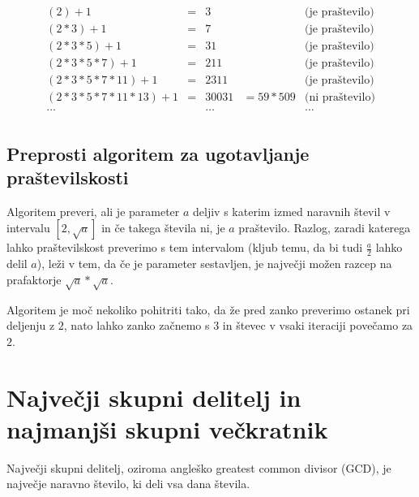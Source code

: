 \documentclass[10pt,a4paper,oneside]{book}
\begin{document}
\[\begin{array}{ccccc}
(2)+1 &=& 3& &\mbox{(je praštevilo)}\\
(2*3)+1 &=& 7& &\mbox{(je praštevilo)}\\
(2*3*5)+1 &=& 31& &\mbox{(je praštevilo)}\\
(2*3*5*7)+1 &=& 211& &\mbox{(je praštevilo)}\\
(2*3*5*7*11)+1 &=& 2311& &\mbox{(je praštevilo)}\\
(2*3*5*7*11*13)+1 &=& 30031 &= 59*509 &\mbox{(ni praštevilo)}\\
\dots & & \dots& & \dots \\
\end{array}\]
\subsection{Preprosti algoritem za ugotavljanje praštevilskosti} 
Algoritem preveri, ali je parameter $a$ deljiv s katerim izmed naravnih števil v intervalu $\left[2, \sqrt{a}\right]$ in če takega števila ni, je $a$ praštevilo. Razlog, zaradi katerega lahko praštevilskost preverimo s tem intervalom (kljub temu, da bi tudi $\frac{a}{2}$ lahko delil $a$), leži v tem, da če je parameter sestavljen, je največji možen razcep na prafaktorje $\sqrt{a}*\sqrt{a}$.

Algoritem je moč nekoliko pohitriti tako, da že pred zanko preverimo ostanek pri deljenju z $2$, nato lahko zanko začnemo s $3$ in števec v vsaki iteraciji povečamo za $2$.\\


\section{Največji skupni delitelj in najmanjši skupni večkratnik}
Največji skupni delitelj, oziroma angleško greatest common divisor (GCD), je največje naravno število, ki deli vsa dana števila.
\end{document}
